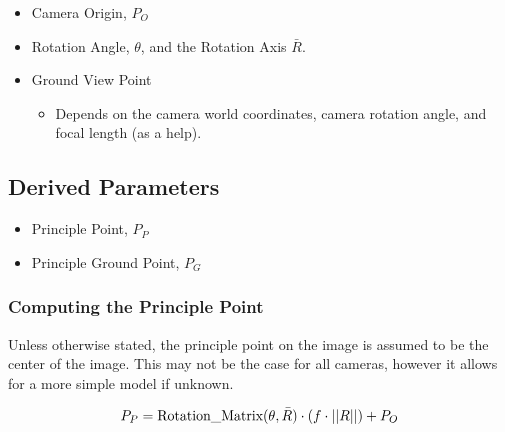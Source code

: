 \begin{itemize}
\item[] \gls{Camera Origin}, $P_O$
\item[] Rotation Angle, $\theta$, and the Rotation Axis $\bar{R}$.
\item[] Ground View Point
    \begin{itemize}
    \item Depends on the camera world coordinates, camera rotation angle, and focal length (as a help). 
    \end{itemize}
\end{itemize}

\subsection*{Derived Parameters}

\begin{itemize}
\item[] \gls{Principle Point}, $P_P$
\item[] \gls{Principle Ground Point}, $P_G$
\end{itemize}

\subsubsection*{Computing the Principle Point}
Unless otherwise stated, the principle point on the image is assumed to be the center of the image. This may not be
the case for all cameras, however it allows for a more simple model if unknown. 

\begin{equation}
P_P = \textup{Rotation\_Matrix}(\theta, \bar{R}) \cdot \left( f \cdot ||R|| \right ) + P_O
\end{equation}

